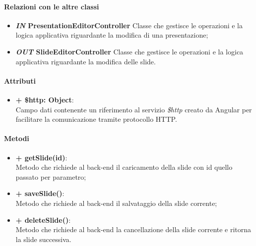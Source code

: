	\paragraph{Relazioni con le altre classi}
	\begin{itemize}
		\item \textbf{\textit{IN} PresentationEditorController}
		Classe che gestisce le operazioni e la logica applicativa riguardante la modifica di una presentazione;
		\item \textbf{\textit{OUT} SlideEditorController}
		Classe che gestisce le operazioni e la logica applicativa riguardante la modifica delle slide.
	\end{itemize}
	
	\paragraph{Attributi}
	\begin{itemize}
		\item \textbf{+ \$http: Object}:\\
		Campo dati contenente un riferimento al servizio \textit{\$http} creato da Angular per facilitare la comunicazione tramite protocollo HTTP.
	\end{itemize}

	\paragraph{Metodi}
	\begin{itemize}
		\item \textbf{+ getSlide(id)}:\\
		Metodo che richiede al back-end il caricamento della slide con id quello passato per parametro;
		\item \textbf{+ saveSlide()}:\\
		Metodo che richiede al back-end il salvataggio della slide corrente;
		\item \textbf{+ deleteSlide()}:\\
		Metodo che richiede al back-end la cancellazione della slide corrente e ritorna la slide successiva.
	\end{itemize}